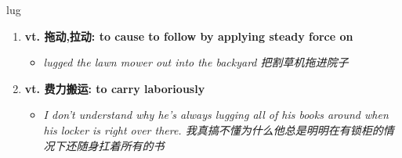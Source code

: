 
\begin{frame}
{\huge lug}
\begin{center}
\begin{enumerate}\Large
  \item \textbf{vt. 拖动,拉动: to cause to follow by applying steady force on}
  \begin{itemize}
    \item \em{\Large{lugged the lawn mower out into the backyard 把割草机拖进院子}}
  \end{itemize}
  \item \textbf{vt. 费力搬运: to carry laboriously}
  \begin{itemize}
    \item \em{\Large{I don't understand why he's always lugging all of his books around when his locker is right over there. 我真搞不懂为什么他总是明明在有锁柜的情况下还随身扛着所有的书}}
  \end{itemize}
\end{enumerate}
\end{center}
\end{frame}
